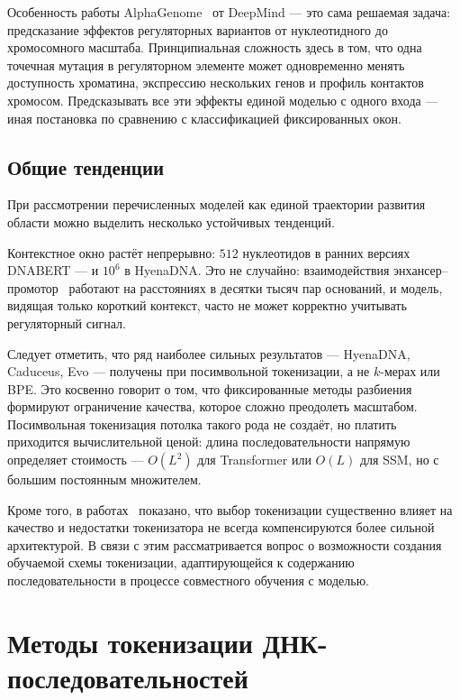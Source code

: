 Особенность работы AlphaGenome~\cite{avsecAlphaGenomeAdvancingRegulatory2025} от
DeepMind --- это сама решаемая задача:
предсказание эффектов регуляторных вариантов от нуклеотидного до
хромосомного масштаба. Принципиальная сложность здесь в том, что
одна точечная мутация в регуляторном элементе может одновременно
менять доступность хроматина, экспрессию нескольких генов и профиль
контактов хромосом. Предсказывать все эти эффекты единой моделью с
одного входа --- иная постановка по сравнению с
классификацией фиксированных окон.

\subsection{Общие тенденции}

При рассмотрении перечисленных моделей как единой траектории развития
области можно выделить несколько устойчивых тенденций.

Контекстное окно растёт непрерывно: $512$ нуклеотидов в ранних
версиях DNABERT --- и $10^6$ в HyenaDNA. Это не случайно:
взаимодействия
энхансер--промотор~\cite{schoenfelderLongrangeEnhancerPromoter2019}
работают на расстояниях в десятки тысяч пар оснований, и модель,
видящая только короткий контекст, часто не может корректно учитывать
регуляторный сигнал.

Следует отметить, что ряд наиболее сильных результатов ---
HyenaDNA, Caduceus, Evo --- получены при посимвольной токенизации, а
не $k$-мерах или BPE. Это косвенно говорит о том, что фиксированные
методы разбиения формируют ограничение качества, которое сложно преодолеть
масштабом. Посимвольная токенизация потолка такого рода не создаёт,
но платить приходится вычислительной ценой: длина последовательности
напрямую определяет стоимость --- $O(L^2)$ для Transformer или $O(L)$
для SSM, но с большим постоянным множителем.

Кроме того, в работах~\cite{lindseyImpactTokenizerSelection2025,
vishniakovGenomicFoundationlessModels2024} показано, что выбор токенизации
существенно влияет на качество и недостатки токенизатора не всегда
компенсируются более сильной архитектурой. В связи с этим рассматривается
вопрос о возможности создания обучаемой схемы токенизации, адаптирующейся
к содержанию последовательности в процессе совместного обучения с моделью.

\section{Методы токенизации ДНК-последовательностей}

